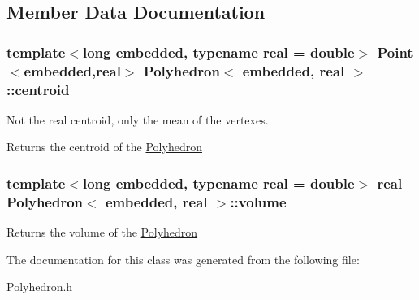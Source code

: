 \subsection{\-Member \-Data \-Documentation}
\hypertarget{class_polyhedron_ab7839d59898be24bb956fc41d1c66096}{
\subsubsection[{centroid}]{\setlength{\rightskip}{0pt plus 5cm}template$<$long embedded, typename real  = double$>$ {\bf \-Point}$<$embedded,real$>$ {\bf \-Polyhedron}$<$ embedded, real $>$\-::{\bf centroid}}}\label{class_polyhedron_ab7839d59898be24bb956fc41d1c66096}


\-Not the real centroid, only the mean of the vertexes. 

\begin{DoxyReturn}{\-Returns}
the centroid of the \hyperlink{class_polyhedron}{\-Polyhedron} 
\end{DoxyReturn}
\hypertarget{class_polyhedron_a0f4ab3ccfdc65071201bdb0b55c2b683}{
\subsubsection[{volume}]{\setlength{\rightskip}{0pt plus 5cm}template$<$long embedded, typename real  = double$>$ real {\bf \-Polyhedron}$<$ embedded, real $>$\-::{\bf volume}}}\label{class_polyhedron_a0f4ab3ccfdc65071201bdb0b55c2b683}
\begin{DoxyReturn}{\-Returns}
the volume of the \hyperlink{class_polyhedron}{\-Polyhedron} 
\end{DoxyReturn}


\-The documentation for this class was generated from the following file\-:\begin{DoxyCompactItemize}
\item 
\-Polyhedron.\-h\end{DoxyCompactItemize}
